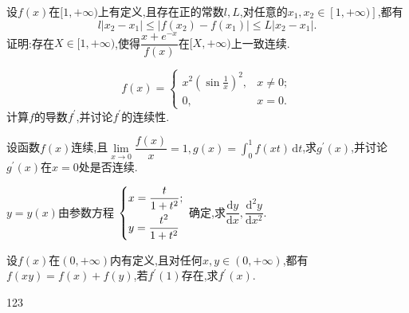 \documentclass[UTF8,a4paper]{ctexart}
\begin{document}
\begin{thinking}[吉林大学,2023]
设$ f(x) $在$ [1,+\infty) $上有定义,且存在正的常数$ l,L $,对任意的$ x_1,x_2\in [1,+\infty)]$,都有
\[
l\lvert x_2-x_1\rvert\leq\lvert f(x_2)-f(x_1)\rvert\leq L\lvert x_2-x_1\rvert .
\]
证明:存在$ X\in[1,+\infty) $,使得$ \dfrac{x+e^{-x}}{f(x)} $在$ [X,+\infty)$上一致连续.
\end{thinking}
\newpage
\begin{example}[中国科学技术大学,2023]
	\begin{equation*}
		f(x)=
		\begin{cases}
			x^2\left (\sin \frac1x\right )^2,&x\neq0;\\
			0,&x=0.
		\end{cases}
	\end{equation*}
计算$f$的导数$f^{\prime}$,并讨论$f^{\prime}$的连续性.
\end{example}
\begin{example}[北京科技大学,2023]
	设函数$ f(x) $连续,且$ \lim\limits_{x\to 0}\dfrac{f(x)}{x}=1,g(x)=\int_{0}^{1}f(xt) \,\mathrm{d}t$,求$ g^{\prime}(x) $,并讨论$ g^{\prime}(x) $在$ x=0 $处是否连续.
\end{example}
\newpage
\begin{thinking}[华东师范大学,2023]
$y=y(x)$由参数方程
	$\left\{\begin{lgathered}
		x=\dfrac{t}{1+t^2};\\
		y=\dfrac{t^2}{1+t^2}
	\end{lgathered}\right.$
确定,求$\dfrac{\mathrm{d}y}{\mathrm{d}x},\dfrac{\mathrm{d}^2y}{\mathrm{d}x^2}$.
\end{thinking}
\begin{thinking}[重庆大学,2023]
	设$ f(x) $在$ (0,+\infty) $内有定义,且对任何$ x,y\in (0,+\infty) $,都有$ f(xy) =f(x)+f(y)$,若$ f^{\prime}(1) $存在,求$ f^{\prime}(x) $.
\end{thinking}
\newpage
\begin{example}
    123
\end{example}
\end{document}

